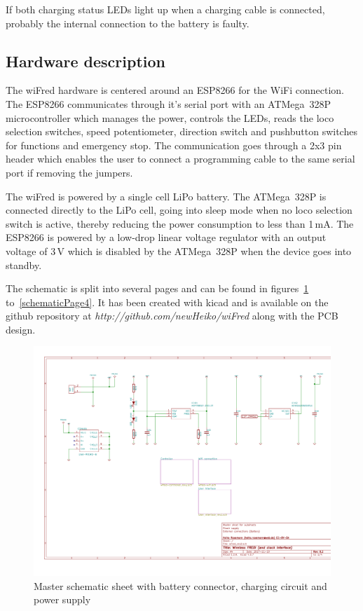 \documentclass[11pt,a4paper]{scrartcl}
\begin{document}
If both charging status LEDs light up when a charging cable is connected, probably the internal connection to the battery is faulty.

\subsection{Hardware description}

The wiFred hardware is centered around an ESP8266 for the WiFi connection. The ESP8266 communicates through it's serial port with an ATMega~328P microcontroller which manages the power, controls the LEDs, reads the loco selection switches, speed potentiometer, direction switch and pushbutton switches for functions and emergency stop. The communication goes through a 2x3 pin header which enables the user to connect a programming cable to the same serial port if removing the jumpers.

The wiFred is powered by a single cell LiPo battery. The ATMega~328P is connected directly to the LiPo cell, going into sleep mode when no loco selection switch is active, thereby reducing the power consumption to less than 1\,mA. The ESP8266 is powered by a low-drop linear voltage regulator with an output voltage of 3\,V which is disabled by the ATMega~328P when the device goes into standby.

The schematic is split into several pages and can be found in figures~\ref{schematicPage1} to~\ref{schematicPage4}. It has been created with kicad and is available on the github repository at \textit{http://github.com/newHeiko/wiFred} along with the PCB design.

\begin{figure}[tbh]
  \centering
  \includegraphics[width=\textwidth]{images/wfred_rev2}
  \caption{Master schematic sheet with battery connector, charging circuit and power supply}
  \label{schematicPage1}
\end{figure}
\end{document}
